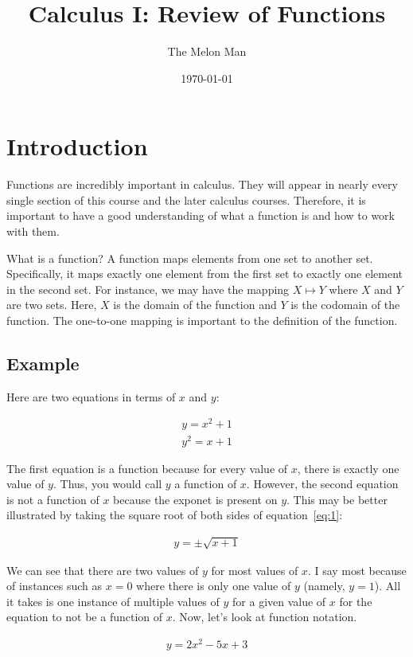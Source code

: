 \documentclass[12pt]{article}
\title{Calculus I: Review of Functions}
\author{The Melon Man}
\date{\today}
\begin{document}
\maketitle

\section{Introduction}
Functions are incredibly important in calculus.
They will appear in nearly every single section of this course and the later calculus courses.
Therefore, it is important to have a good understanding of what a function is and how to work with them.

What is a function?
A function maps elements from one set to another set.
Specifically, it maps exactly one element from the first set to exactly one element in the second set.
For instance, we may have the mapping $X \mapsto Y$ where $X$ and $Y$ are two sets.
Here, $X$ is the domain of the function and $Y$ is the codomain of the function.
The one-to-one mapping is important to the definition of the function.

\subsection{Example}
Here are two equations in terms of $x$ and $y$:

\begin{align}
    y = x^2 + 1 \\
    y^2 = x + 1 \label{eq:1}
\end{align}

The first equation is a function because for every value of $x$, there is exactly one value of $y$.
Thus, you would call $y$ a function of $x$.
However, the second equation is not a function of $x$ because the exponet is present on $y$.
This may be better illustrated by taking the square root of both sides of equation~\eqref{eq:1}:

\begin{align*}
    y = \pm \sqrt{x + 1}
\end{align*}

We can see that there are two values of $y$ for most values of $x$.
I say most because of instances such as $x = 0$ where there is only one value of $y$ (namely, $y = 1$).
All it takes is one instance of multiple values of $y$ for a given value of $x$ for the equation to not be a function of $x$.
Now, let's look at function notation.

\begin{align}
    \label{eq:2} y = 2x^2-5x+3
\end{align}
\end{document}
